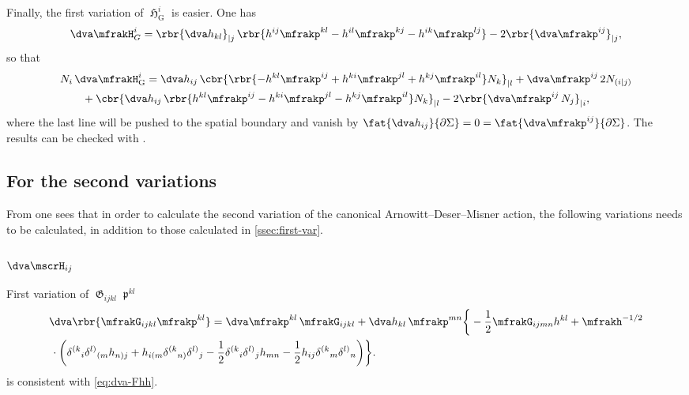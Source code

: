 \documentclass[a4paper,11pt]{article}
\begin{document}
Finally, the first variation of $\mfrakH_\text{G}^i$ is easier. One has
\begin{align}
\dva \mfrakH_G^i = \rbr{\dva h_{kl}}_{|j}\,
\rbr{h^{ij}\mfrakp^{kl} - h^{il}\mfrakp^{kj} - h^{ik}\mfrakp^{lj}}
-2\rbr{\dva \mfrakp^{ij}}_{|j},
\end{align}
so that
\begin{align}
&
N_i\,\dva \mfrakH_\text{G}^i = \dva h_{ij}\,\cbr{\rbr{
-h^{kl}\mfrakp^{ij} + h^{ki}\mfrakp^{jl} + h^{kj}\mfrakp^{il}} N_k}_{|l}
+\dva \mfrakp^{ij}\,2N_{(i|j)}
\nonumber \\
&\qquad
+\cbr{\dva h_{ij}\,\rbr{
h^{kl}\mfrakp^{ij} - h^{ki}\mfrakp^{jl} - h^{kj}\mfrakp^{il}} N_k}_{|l}
- 2\rbr{\dva \mfrakp^{ij}\,N_{j}}_{|i},
\end{align}
where the last line will be pushed to the spatial boundary and vanish by
$\fat{\dva h_{ij}}{\partial\Sigma} = 0 =
\fat{\dva \mfrakp^{ij}}{\partial\Sigma}$. The results can be checked with 
\cite[ch.\ 4.2.7]{Poisson2004}.

\subsection{For the second variations}
\label{ssec:second-var}

From  one sees that in 
order to calculate the second variation of the canonical 
Arnowitt--Deser--Misner action, the following variations needs to be 
calculated, in addition to those calculated in \cref{ssec:first-var}.

\subsubsection{$\dva\mscrH_{ij}$}


First variation of $\mfrakG_{ijkl}\mfrakp^{kl}$
\begin{align}
&\dva\rbr{\mfrakG_{ijkl}\mfrakp^{kl}} =
\dva\mfrakp^{kl}\,\mfrakG_{ijkl}+\dva h_{kl}\,\mfrakp^{mn}
\bigg\{-\frac{1}{2}\mfrakG_{ijmn}h^{kl} + \mfrakh^{-1/2}
\nonumber \\
&\,\cdot\bigg(
\delta^{(k}{}_{i} \delta^{l)}{}_{(m} h_{n)j} +
h_{i(m} \delta^{(k}{}_{n)} \delta^{l)}{}_{j} - \frac{1}{2}
\delta^{(k}{}_{i} \delta^{l)}{}_{j} h_{mn} - \frac{1}{2}
h_{ij} \delta^{(k}{}_{m} \delta^{l)}{}_{n} \bigg)\bigg\}.
\label{eq:dva-Gp}
\end{align}
 is consistent with \cref{eq:dva-Fhh}.
\end{document}
